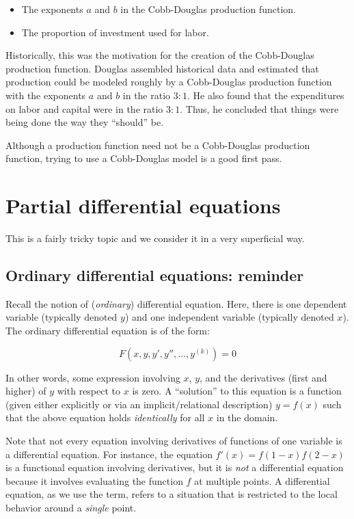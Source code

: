 \documentclass[10pt]{amsart}
\begin{document}
\begin{itemize}
\item The exponents $a$ and $b$ in the Cobb-Douglas production function.
\item The proportion of investment used for labor.
\end{itemize}

Historically, this was the motivation for the creation of the
Cobb-Douglas production function. Douglas assembled historical data
and estimated that production could be modeled roughly by a
Cobb-Douglas production function with the exponents $a$ and $b$ in the
ratio $3:1$. He also found that the expenditures on labor and capital
were in the ratio $3:1$. Thus, he concluded that things were being
done the way they ``should'' be.

Although a production function need not be a Cobb-Douglas production
function, trying to use a Cobb-Douglas model is a good first pass.

\section{Partial differential equations}

This is a fairly tricky topic and we consider it in a very superficial
way.

\subsection{Ordinary differential equations: reminder}

Recall the notion of ({\em ordinary}) differential equation. Here,
there is one dependent variable (typically denoted $y$) and one
independent variable (typically denoted $x$). The ordinary
differential equation is of the form:

$$F(x,y,y',y'', \dots, y^{(k)}) = 0$$

In other words, some expression involving $x$, $y$, and the
derivatives (first and higher) of $y$ with respect to $x$ is zero. A
``solution'' to this equation is a function (given either explicitly
or via an implicit/relational description) $y = f(x)$ such that the
above equation holds {\em identically} for all $x$ in the domain.

Note that not every equation involving derivatives of functions of one
variable is a differential equation. For instance, the equation $f'(x)
= f(1 - x)f(2 - x)$ is a functional equation involving derivatives,
but it is {\em not} a differential equation because it involves
evaluating the function $f$ at multiple points. A differential
equation, as we use the term, refers to a situation that is restricted
to the local behavior around a {\em single} point.
\end{document}
